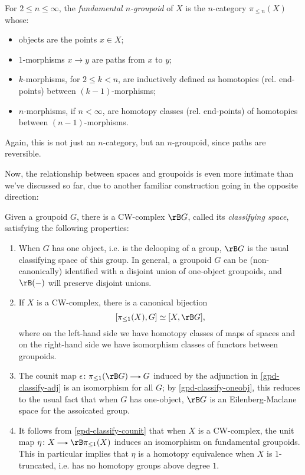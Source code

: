\begin{definition}
  \label{gpd-higher-fundamental}
  For $2 \le n \le \infty$, the \emph{fundamental $n$-groupoid} of $X$ is the $n$-category $\pi_{\le n}(X)$ whose:
  \begin{itemize}
  \item objects are the points $x \in X$;
  \item $1$-morphisms $x \to y$ are paths from $x$ to $y$;
  \item $k$-morphisms, for $2 \le k < n$, are inductively defined as homotopies (rel. end-points) between $(k-1)$-morphisms;
  \item $n$-morphisms, if $n < \infty$, are homotopy classes (rel. end-points) of homotopies between $(n-1)$-morphisms.
  \end{itemize}
  Again, this is not just an $n$-category, but an $n$-groupoid, since paths are reversible.
\end{definition}

Now, the relationship between spaces and groupoids is even more intimate than we've discussed so far, due to another familiar construction going in the opposite direction:

\begin{nothing}
  \label{gpd-classify}
  Given a groupoid $G$, there is a CW-complex $\rB G$, called its \emph{classifying space}, satisfying the following properties:
  \begin{enumerate}
  \item \label{gpd-classify-oneobj} When $G$ has one object, i.e. is the delooping of a group, $\rB G$ is the usual classifying space of this group. In general, a groupoid $G$ can be (non-canonically) identified with a disjoint union of one-object groupoids, and $\rB(-)$ will preserve disjoint unions.
  \item \label{gpd-classify-adj} If $X$ is a CW-complex, there is a canonical bijection
    \[
      [\pi_{\le 1}(X), G] \iso [X, \rB G],
    \]
    where on the left-hand side we have homotopy classes of maps of spaces and on the right-hand side we have isomorphism classes of functors between groupoids.
  \item \label{gpd-classify-counit} The counit map $\epsilon \c \pi_{\le 1}(\rB G) \to G$ induced by the adjunction in \cref{gpd-classify-adj} is an isomorphism for all $G$; by \cref{gpd-classify-oneobj}, this reduces to the usual fact that when $G$ has one-object, $\rB G$ is an Eilenberg-Maclane space for the assoicated group.
  \item \label{gpd-classify-unit} It follows from \cref{gpd-classify-counit} that when $X$ is a CW-complex, the unit map $\eta \c X \to \rB\pi_{\le 1}(X)$ induces an isomorphism on fundamental groupoids. This in particular implies that $\eta$ is a homotopy equivalence when $X$ is $1$-truncated, i.e. has no homotopy groups above degree $1$.
  \end{enumerate}
\end{nothing}

